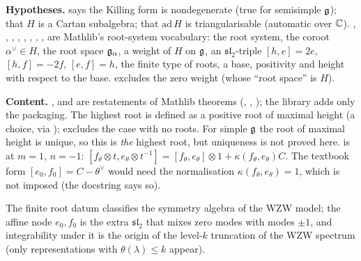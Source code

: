\begin{dictionary}
\textbf{Hypotheses.}  says the Killing form is nondegenerate (true for
semisimple $\mathfrak{g}$); \allowbreak{} that $H$ is a Cartan subalgebra;
 that $\mathrm{ad}\,H$ is triangularisable (automatic over ${\mathbb{C}}$). ,
, , , , , ,
,  are Mathlib's root-system vocabulary: the root system, the coroot
$\alpha^\vee\in H$, the root space $\mathfrak{g}_\alpha$, a weight of $H$ on $\mathfrak{g}$, an $\mathfrak{sl}_2$-triple
$[h,e] = 2e$, $[h,f] = -2f$, $[e,f] = h$, the finite type of roots, a base, positivity and height
with respect to the base.  excludes the zero weight (whose ``root space'' is $H$).

\textbf{Content.} , \allowbreak{} and  are
restatements of Mathlib theorems (\allowbreak{}\allowbreak{},
\allowbreak{}\allowbreak{}\allowbreak{}\allowbreak{}, \allowbreak{}); the library adds only the
packaging. The highest root is defined as a positive root of maximal height (a choice, via
\allowbreak{}\allowbreak{}\allowbreak{});  excludes the case with no roots. For simple
$\mathfrak{g}$ the root of maximal height is unique, so this is \emph{the} highest root, but uniqueness is not
proved here. \allowbreak{}\allowbreak{} is  at $m = 1$, $n = -1$:
$[f_\theta\otimes t, e_\theta\otimes t^{-1}] = [f_\theta,e_\theta]\otimes1 + \kappa(f_\theta,e_\theta)C$. The textbook
form $[e_0,f_0] = C-\theta^\vee$ would need the normalisation $\kappa(f_\theta,e_\theta) = 1$, which is not
imposed (the docstring says so).
\end{dictionary}

\begin{physics}
The finite root datum classifies the symmetry algebra of the WZW model; the affine node $e_0,f_0$ is
the extra $\mathfrak{sl}_2$ that mixes zero modes with modes $\pm1$, and integrability under it is the
origin of the level-$k$ truncation of the WZW spectrum (only representations with $\theta(\lambda)\le k$
appear).
\end{physics}

